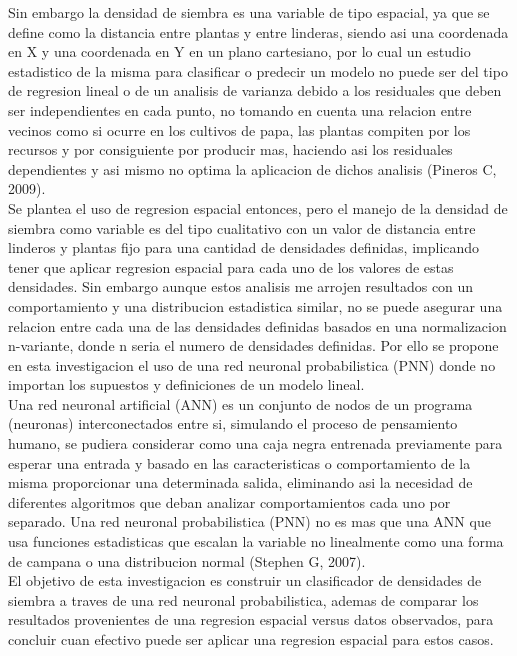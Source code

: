 Sin embargo la densidad de siembra es una variable de tipo espacial, ya que se define como la distancia entre plantas y entre linderas, siendo asi una coordenada en X y una coordenada en Y en un plano cartesiano, por lo cual un estudio estadistico de la misma para clasificar o predecir un modelo no puede ser del tipo de regresion lineal o de un analisis de varianza debido a los residuales que deben ser independientes en cada punto, no tomando en cuenta una relacion entre vecinos como si ocurre en los cultivos de papa, las plantas compiten por los recursos y por consiguiente por producir mas, haciendo asi los residuales dependientes y asi mismo no optima la aplicacion de dichos analisis (Pineros C, 2009). \\

Se plantea el uso de regresion espacial entonces, pero el manejo de la densidad de siembra como variable es del tipo cualitativo con un valor de distancia entre linderos y plantas fijo para una cantidad de densidades definidas, implicando tener que aplicar regresion espacial para cada uno de los valores de estas densidades. Sin embargo aunque estos analisis me arrojen resultados con un comportamiento y una distribucion estadistica similar, no se puede asegurar una relacion entre cada una de las densidades definidas basados en una normalizacion n-variante, donde n seria el numero de densidades definidas. Por ello se propone en esta investigacion el uso de una red neuronal probabilistica (PNN) donde no importan los supuestos y definiciones de un modelo lineal.\\

Una red neuronal artificial (ANN) es un conjunto de nodos de un programa (neuronas) interconectados entre si, simulando el proceso de pensamiento humano, se pudiera considerar como una caja negra entrenada previamente para esperar una entrada y basado en las caracteristicas o comportamiento de la misma proporcionar una determinada salida, eliminando asi la necesidad de diferentes algoritmos que deban analizar comportamientos cada uno por separado. Una red neuronal probabilistica (PNN) no es mas que una ANN que usa funciones estadisticas que escalan la variable no linealmente como una forma de campana o una distribucion normal (Stephen G, 2007).\\

El objetivo de esta investigacion es construir un clasificador de densidades de siembra a traves de una red neuronal probabilistica, ademas de comparar los resultados provenientes de una regresion espacial versus datos observados, para concluir cuan efectivo puede ser aplicar una regresion espacial para estos casos.\\